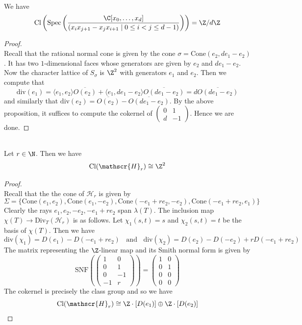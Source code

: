 \documentclass[a4paper]{article}
\begin{document}
\begin{eg}{}{}\\
We have $$\text{Cl}\left(\text{Spec}\left(\frac{\C[x_0,\dots,x_d]}{(x_ix_{j+1}-x_jx_{i+1}\;|\;0\leq i<j\leq d-1)}\right)\right)=\Z/d\Z$$
\begin{proof}\\
Recall that the rational normal cone is given by the cone $\sigma=\text{Cone}(e_2,de_1-e_2)$. It has two $1$-dimensional faces whose generators are given by $e_2$ and $de_1-e_2$. Now the character lattice of $S_\sigma$ is $\Z^2$ with generators $e_1$ and $e_2$. Then we compute that $$\text{div}(e_1)=\langle e_1,e_2\rangle\overline{O(e_2)}+\langle e_1,de_1-e_2\rangle\overline{O(de_1-e_2)}=d\overline{O(de_1-e_2)}$$ and similarly that $\text{div}(e_2)=\overline{O(e_2)}-\overline{O(de_1-e_2)}$. By the above proposition, it suffices to compute the cokernel of $\begin{pmatrix}
0 & 1\\
d & -1
\end{pmatrix}$. Hence we are done. 
\end{proof}
\end{eg}

\begin{eg}{}{}\\
Let $r\in\N$. Then we have $$\text{Cl}(\mathscr{H}_r)\cong\Z^2$$
\begin{proof}\\
Recall that the the cone of $\mathscr{H}_r$ is given by $$\Sigma=\{\text{Cone}(e_1,e_2),\text{Cone}(e_1,-e_2),\text{Cone}(-e_1+re_2,-e_2),\text{Cone}(-e_1+re_2,e_1)\}$$ Clearly the rays $e_1,e_2,-e_2,-e_1+re_2$ span $\lambda(T)$. The inclusion map $\chi(T)\to\text{Div}_T(\mathscr{H}_r)$ is as follows. Let $\chi_1(s,t)=s$ and $\chi_2(s,t)=t$ be the basis of $\chi(T)$. Then we have $$\text{div}(\chi_1)=D(e_1)-D(-e_1+re_2)\;\;\text{ and }\;\;\text{div}(\chi_2)=D(e_2)-D(-e_2)+rD(-e_1+re_2)$$ The matrix representing the $\Z$-linear map and its Smith normal form is given by $$\text{SNF}\left(\begin{pmatrix}
1 & 0\\
0 & 1\\
0 & -1\\
-1 & r
\end{pmatrix}\right)=\begin{pmatrix}
1 & 0\\
0 & 1\\
0 & 0\\
0 & 0
\end{pmatrix}$$ The cokernel is precisely the class group and so we have $$\text{Cl}(\mathscr{H}_r)\cong\Z\cdot[D(e_1)]\oplus\Z\cdot[D(e_2)]$$
\end{proof}
\end{eg}
\end{document}
